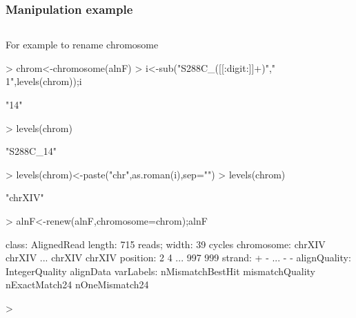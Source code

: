\documentclass{beamer}
\begin{document}

\begin{frame}[fragile]
\frametitle{Manipulation example}
\begin{column}{1\textwidth}
  \bit
      \item For example to rename chromosome
      \begin{uncoverenv}
\begin{Schunk}
\begin{Sinput}
> chrom<-chromosome(alnF)
> i<-sub("S288C_([[:digit:]]+)","\\1",levels(chrom));i
\end{Sinput}
\begin{Soutput}
[1] "14"
\end{Soutput}
\begin{Sinput}
> levels(chrom)
\end{Sinput}
\begin{Soutput}
[1] "S288C_14"
\end{Soutput}
\begin{Sinput}
> levels(chrom)<-paste("chr",as.roman(i),sep="")
> levels(chrom)
\end{Sinput}
\begin{Soutput}
[1] "chrXIV"
\end{Soutput}
\begin{Sinput}
> alnF<-renew(alnF,chromosome=chrom);alnF
\end{Sinput}
\begin{Soutput}
class: AlignedRead
length: 715 reads; width: 39 cycles
chromosome: chrXIV chrXIV ... chrXIV chrXIV 
position: 2 4 ... 997 999 
strand: + - ... - - 
alignQuality: IntegerQuality 
alignData varLabels: nMismatchBestHit mismatchQuality nExactMatch24 nOneMismatch24 
\end{Soutput}
\begin{Sinput}
> 
\end{Sinput}
\end{Schunk}
       \end{uncoverenv} 
  \eit
  \end{column}
\end{frame}

\end{document}
